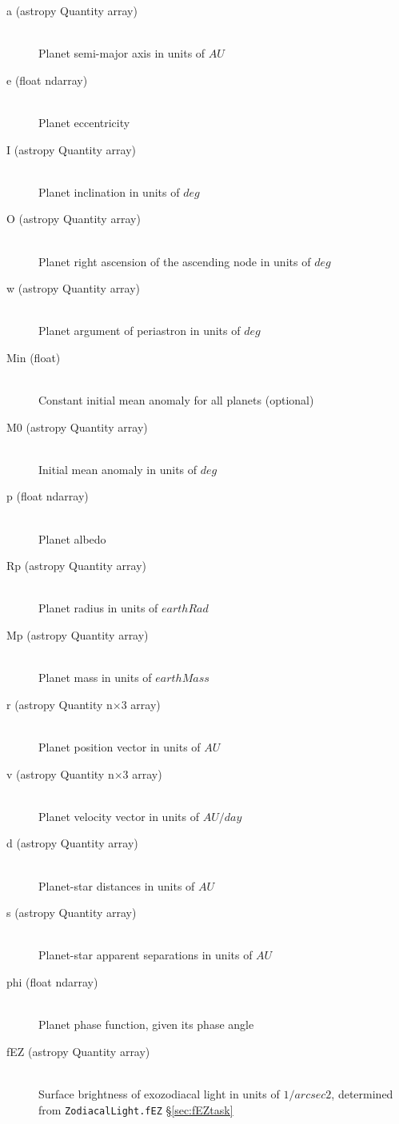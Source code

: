 \documentclass[cleanfoot]{asme2ej}
\begin{document}
\begin{itemize}
\begin{description}
    \item[a (astropy Quantity array)] \hfill \\ Planet semi-major axis in units of $ AU $
    \item[e (float ndarray)] \hfill \\ Planet eccentricity
    \item[I (astropy Quantity array)] \hfill \\ Planet inclination in units of $ deg $
    \item[O (astropy Quantity array)] \hfill \\ Planet right ascension of the ascending node in units of $ deg $
    \item[w (astropy Quantity array)] \hfill \\ Planet argument of periastron in units of $ deg $
    \item[Min (float)] \hfill \\ Constant initial mean anomaly for all planets (optional)
    \item[M0 (astropy Quantity array)] \hfill \\ Initial mean anomaly in units of $ deg $
    \item[p (float ndarray)] \hfill \\ Planet albedo
    \item[Rp (astropy Quantity array)] \hfill \\ Planet radius in units of $earthRad$
    \item[Mp (astropy Quantity array)] \hfill \\ Planet mass in units of $earthMass$
    \item[r (astropy Quantity n$\times$3 array)] \hfill \\ Planet position vector in units of $ AU $
    \item[v (astropy Quantity n$\times$3 array)] \hfill \\ Planet velocity vector in units of $ AU/day $
    \item[d (astropy Quantity array)] \hfill \\ Planet-star distances in units of $ AU $
    \item[s (astropy Quantity array)] \hfill \\ Planet-star apparent separations in units of $ AU $
    \item[phi (float ndarray)] \hfill \\ Planet phase function, given its phase angle
    \item[fEZ (astropy Quantity array)] \hfill \\ Surface brightness of exozodiacal light in units of $ 1/arcsec2 $, determined from \verb+ZodiacalLight.fEZ+ \S\ref{sec:fEZtask}

\end{description}
\end{itemize}
\end{document}
